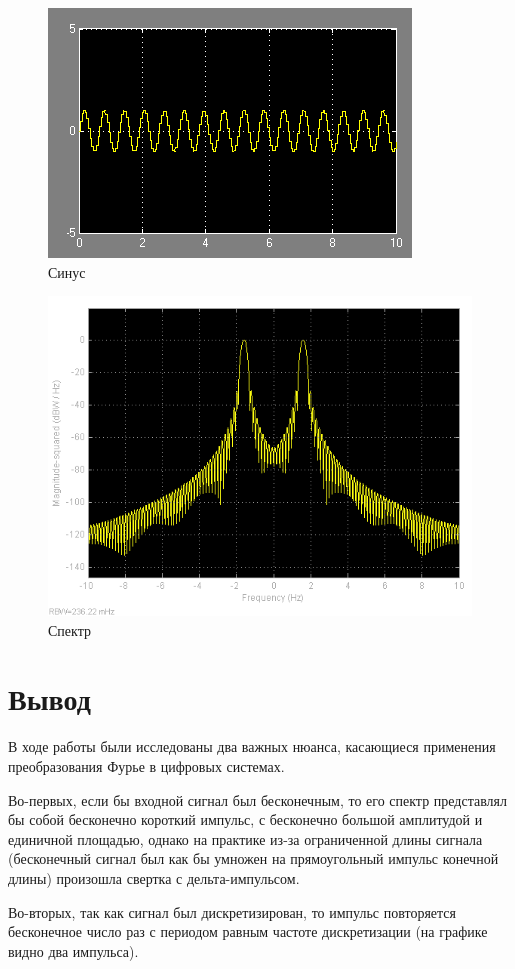 \documentclass[a4paper, 12pt]{article}
\begin{document}
\begin{figure}[H]
   \includegraphics[scale=0.7]{lab4/sin_simulink.png}
   \caption{Синус}
\end{figure}

\begin{figure}[H]
   \includegraphics[scale=0.7]{lab4/scope.png}
   \caption{Спектр}
\end{figure}

\section{Вывод}

В ходе работы были исследованы два важных нюанса, касающиеся применения преобразования Фурье в цифровых системах.

Во-первых, если бы входной сигнал был бесконечным, то его спектр представлял бы собой бесконечно короткий импульс, с бесконечно большой амплитудой и единичной площадью, однако на практике из-за ограниченной длины сигнала (бесконечный сигнал был как бы умножен на прямоугольный импульс конечной длины) произошла свертка с дельта-импульсом.

Во-вторых, так как сигнал был дискретизирован, то импульс повторяется бесконечное число раз с периодом равным частоте дискретизации (на графике видно два импульса).
\end{document}
